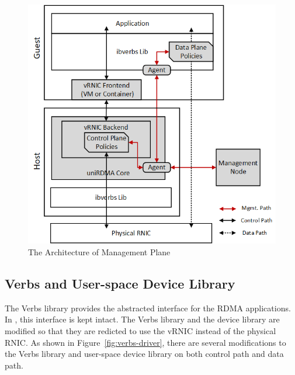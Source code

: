 \begin{figure}[!ht]
	\centering
	\includegraphics[width=1\linewidth]{images/mgmt-center.png}
	\caption{The Architecture of \sys Management Plane}
	\label{fig:mgmt-center}
\end{figure}

\subsection{Verbs and User-space Device Library}


The Verbs library provides the abstracted interface for the RDMA applications. In \sys, this interface is kept intact.
The Verbs library and the device library are modified so that they are redicted to use the vRNIC instead of the physical RNIC. As shown in Figure~\ref{fig:verbs-driver}, there are several modifications to the Verbs library and user-space device library on both control path and data path.

